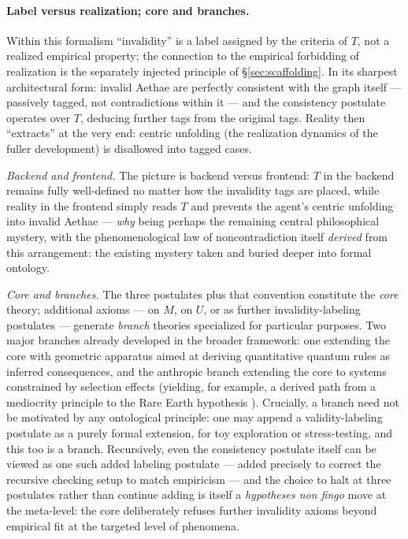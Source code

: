 \paragraph{Label versus realization; core and branches.} Within this formalism ``invalidity'' is a label assigned by the criteria of $T$, not a realized empirical property; the connection to the empirical forbidding of realization is the separately injected principle of §\ref{sec:scaffolding}. In its sharpest architectural form: invalid Aethae are perfectly consistent with the graph itself --- passively tagged, not contradictions within it --- and the consistency postulate operates over $T$, deducing further tags from the original tags. Reality then ``extracts'' at the very end: centric unfolding (the realization dynamics of the fuller development) is disallowed into tagged cases.

\textit{Backend and frontend.} The picture is backend versus frontend: $T$ in the backend remains fully well-defined no matter how the invalidity tags are placed, while reality in the frontend simply reads $T$ and prevents the agent's centric unfolding into invalid Aethae --- \emph{why} being perhaps the remaining central philosophical mystery, with the phenomenological law of noncontradiction itself \emph{derived} from this arrangement: the existing mystery taken and buried deeper into formal ontology.

\textit{Core and branches.} The three postulates plus that convention constitute the \emph{core} theory; additional axioms --- on $M$, on $U$, or as further invalidity-labeling postulates --- generate \emph{branch} theories specialized for particular purposes. Two major branches already developed in the broader framework: one extending the core with geometric apparatus aimed at deriving quantitative quantum rules as inferred consequences, and the anthropic branch extending the core to systems constrained by selection effects (yielding, for example, a derived path from a mediocrity principle to the Rare Earth hypothesis \cite{NexicFoundation}). Crucially, a branch need not be motivated by any ontological principle: one may append a validity-labeling postulate as a purely formal extension, for toy exploration or stress-testing, and this too is a branch. Recursively, even the consistency postulate itself can be viewed as one such added labeling postulate --- added precisely to correct the recursive checking setup to match empiricism --- and the choice to halt at three postulates rather than continue adding is itself a \emph{hypotheses non fingo} \cite{newton1687principia} move at the meta-level: the core deliberately refuses further invalidity axioms beyond empirical fit at the targeted level of phenomena.

